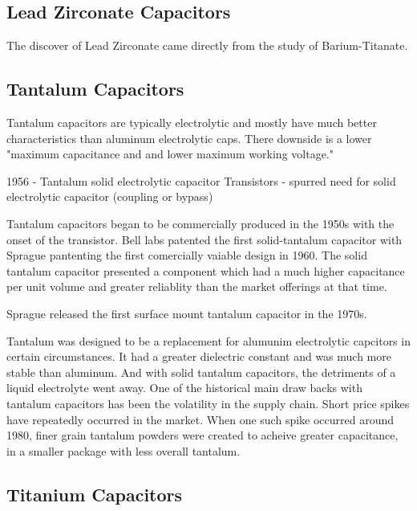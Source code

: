 \subsection{Lead Zirconate Capacitors}
    The discover of Lead Zirconate came directly from the study of Barium-Titanate.

\subsection{Tantalum Capacitors}
Tantalum capacitors are typically electrolytic and mostly have much better characteristics than aluminum electrolytic caps. There downside is a lower "maximum capacitance and and lower maximum working voltage."\cite{learn_caps}

    1956 - Tantalum solid electrolytic capacitor
    Transistors - spurred need for solid electrolytic capacitor (coupling or bypass) \cite[f.~56-64]{dumInv}

    Tantalum capacitors began to be commercially produced in the 1950s with the onset of the transistor. Bell labs patented the first solid-tantalum capacitor with Sprague pantenting the first comercially vaiable design in 1960. The solid tantalum capacitor presented a component which had a much higher capacitance per unit volume and greater reliablity than the market offerings at that time. \cite{charTant}

    Sprague released the first surface mount tantalum capacitor in the 1970s.\cite{spragueHist}

    Tantalum was designed to be a replacement for alumunim electrolytic capcitors in certain circumstances. It had a greater dielectric constant and was much more stable than aluminum. And with solid tantalum capacitors, the detriments of a liquid electrolyte went away. One of the historical main draw backs with tantalum capacitors has been the volatility in the supply chain. Short price spikes have repeatedly occurred in the market. When one such spike occurred around 1980, finer grain tantalum powders were created to acheive greater capacitance, in a smaller package with less overall tantalum. \cite[ch~3.1]{tantMis}

\subsection{Titanium Capacitors}

